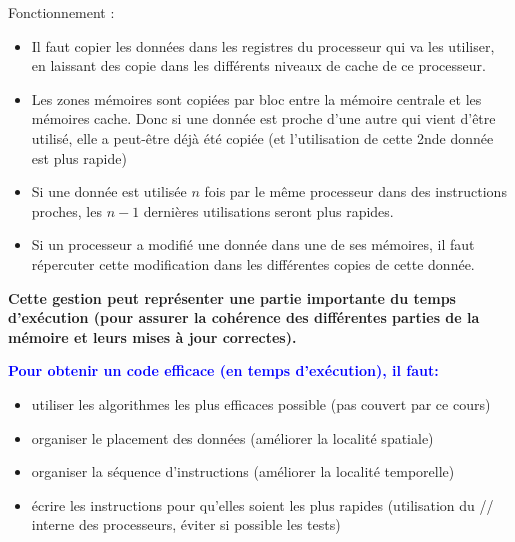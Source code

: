 \documentclass{beamer}
\begin{document}
\begin{frame}[fragile]
Fonctionnement :

\begin{itemize}
	\item Il faut copier les donn\'ees dans les registres du processeur qui va les utiliser, en laissant des copie dans les diff\'erents niveaux de cache de ce processeur. 
	\vfill
	
	\item Les zones m\'emoires sont copi\'ees par bloc entre la m\'emoire centrale et les m\'emoires cache. Donc si une donn\'ee est proche d'une autre qui vient d'\^etre utilis\'e, elle a peut-\^etre d\'ej\`a \'et\'e copi\'ee (et l'utilisation de cette 2nde donn\'ee est plus rapide)	
\end{itemize}
	\vfill
\end{frame}

\begin{frame}[fragile]
	
\begin{itemize}
	\item Si une donn\'ee est utilis\'ee $n$ fois par le m\^eme processeur dans des instructions proches, les $n-1$ derni\`eres utilisations seront plus rapides.
\vfill

	\item Si un processeur a modifi\'e une donn\'ee dans une de ses m\'emoires, il faut r\'epercuter cette modification dans les diff\'erentes copies de cette donn\'ee.
	\vfill
\end{itemize}
	\vfill

{\bf Cette gestion peut repr\'esenter une partie im\-por\-tante du temps d'ex\'ecution (pour assurer la coh\'erence des diff\'erentes parties de la m\'emoire et leurs mises \`a jour correctes).}
	\vfill


\end{frame}

\begin{frame}[fragile]

\bf
\textcolor{blue}{Pour obtenir un code efficace (en temps d'ex\'ecution), il faut:}

\begin{itemize}
	\item utiliser les algorithmes les plus efficaces possible (pas couvert par ce cours)
	
	\item organiser le placement des donn\'ees (am\'eliorer la localit\'e spatiale)
	
	\item organiser la s\'equence d'instructions (am\'eliorer la localit\'e temporelle)

	\item \'ecrire les instructions pour qu'elles soient les plus rapides (utilisation du // interne des processeurs, \'eviter si possible les tests)
\end{itemize}
\end{frame}
\end{document}
